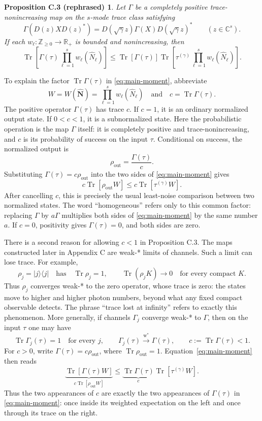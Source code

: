 \documentclass[11pt]{article}
\newcommand{\Tr}{\operatorname{Tr}}
\newcommand{\C}{\mathbb C}
\newcommand{\R}{\mathbb R}
\newtheorem*{propC}{Proposition C.3 (rephrased)}
\begin{document}
\begin{propC}
Let $\Gamma$ be a completely positive trace-nonincreasing map on the
$s$-mode trace class satisfying
\[
  \Gamma(D(z)XD(z)^*)
  =D(\sqrt\gamma z)\Gamma(X)D(\sqrt\gamma z)^*
  \qquad(z\in\C^s).
\]
If each $w_\ell:\mathbb Z_{\geq0}\to\R_+$ is bounded and nonincreasing, then
\begin{equation}\label{eq:main-moment}
  \Tr\!\left[\Gamma(\tau)
    \prod_{\ell=1}^s w_\ell(\widehat N_\ell)\right]
  \leq
  \Tr[\Gamma(\tau)]
  \Tr\!\left[\tau^{(\gamma)}
    \prod_{\ell=1}^s w_\ell(\widehat N_\ell)\right].
\end{equation}
\end{propC}

To explain the factor $\Tr\Gamma(\tau)$ in
\eqref{eq:main-moment}, abbreviate
\[
  W=W(\widehat{\mathbf N})
  =\prod_{\ell=1}^s w_\ell(\widehat N_\ell)
  \quad\text{and}\quad
  c=\Tr\Gamma(\tau).
\]
The positive operator $\Gamma(\tau)$ has trace $c$.  If $c=1$, it is an
ordinary normalized output state.  If $0<c<1$, it is a subnormalized state.
Here the probabilistic operation is the map $\Gamma$ itself: it is completely
positive and trace-nonincreasing, and $c$ is its probability of success on the
input $\tau$.  Conditional on success, the normalized output is
\[
  \rho_{\mathrm{out}}=\frac{\Gamma(\tau)}{c}.
\]
Substituting $\Gamma(\tau)=c\rho_{\mathrm{out}}$ into the two sides of
\eqref{eq:main-moment} gives
\[
  c\Tr[\rho_{\mathrm{out}}W]
  \leq c\Tr[\tau^{(\gamma)}W].
\]
After cancelling $c$, this is precisely the usual least-noise comparison
between two normalized states.  The word ``homogeneous'' refers only to this
common factor: replacing $\Gamma$ by $a\Gamma$ multiplies both sides of
\eqref{eq:main-moment} by the same number $a$.  If $c=0$, positivity gives
$\Gamma(\tau)=0$, and both sides are zero.

There is a second reason for allowing $c<1$ in Proposition C.3.  The maps
constructed later in Appendix C are weak-* limits of channels.  Such a limit
can lose trace.  For example,
\[
  \rho_j=|j\rangle\!\langle j|
  \quad\text{has}\quad \Tr\rho_j=1,
  \qquad
  \Tr(\rho_jK)\longrightarrow0
  \quad\text{for every compact }K.
\]
Thus $\rho_j$ converges weak-* to the zero operator, whose trace is zero: the
states move to higher and higher photon numbers, beyond what any fixed
compact observable detects.  The phrase ``trace lost at infinity'' refers
to exactly this phenomenon.  More generally, if channels $\Gamma_j$ converge
weak-* to $\Gamma$, then on the input $\tau$ one may have
\[
  \Tr\Gamma_j(\tau)=1\quad\text{for every }j,
  \qquad
  \Gamma_j(\tau)\xrightarrow{\mathrm{w}^*}\Gamma(\tau),
  \qquad
  c:=\Tr\Gamma(\tau)<1.
\]
For $c>0$, write $\Gamma(\tau)=c\rho_{\mathrm{out}}$, where
$\Tr\rho_{\mathrm{out}}=1$.  Equation~\eqref{eq:main-moment} then reads
\[
  \underbrace{\Tr[\Gamma(\tau)W]}_{c\Tr[\rho_{\mathrm{out}}W]}
  \leq
  \underbrace{\Tr\Gamma(\tau)}_{c}
  \Tr[\tau^{(\gamma)}W].
\]
Thus the two appearances of $c$ are exactly the two appearances of
$\Gamma(\tau)$ in \eqref{eq:main-moment}: once inside its weighted
expectation on the left and once through its trace on the right.
\end{document}
